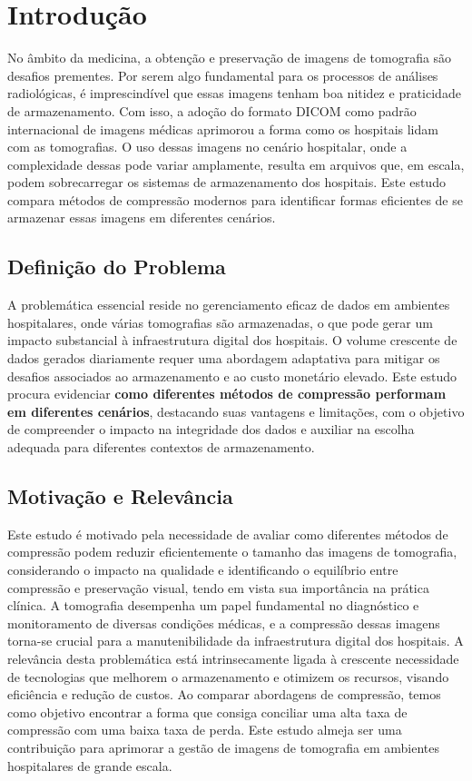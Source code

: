 \chapter{Introdução}
\label{cap:intro}

No âmbito da medicina, a obtenção e preservação de imagens de tomografia são desafios prementes. Por serem algo fundamental para os processos de análises radiológicas, é imprescindível que essas imagens tenham boa nitidez e praticidade de armazenamento. Com isso, a adoção do formato \acrfull{DICOM}
\cite{DICOM} como padrão internacional de imagens médicas aprimorou a forma como os hospitais lidam com as tomografias. O uso dessas imagens no cenário hospitalar, onde a complexidade dessas pode variar amplamente, resulta em arquivos que, em escala, podem sobrecarregar os sistemas de armazenamento dos hospitais. Este estudo compara métodos de compressão modernos para identificar formas eficientes de se armazenar essas imagens em diferentes cenários. 

\section{Definição do Problema}
\label{intro:prob}

A problemática essencial reside no gerenciamento eficaz de dados em ambientes hospitalares, onde várias tomografias são armazenadas, o que pode gerar um impacto substancial à infraestrutura digital dos hospitais. O volume crescente de dados gerados diariamente requer uma abordagem adaptativa para mitigar os desafios associados ao armazenamento e ao custo monetário elevado. Este estudo procura evidenciar \textbf{como diferentes métodos de compressão performam em diferentes cenários}, destacando suas vantagens e limitações, com o objetivo de compreender o impacto na integridade dos dados e auxiliar na escolha adequada para diferentes contextos de armazenamento.

\section{Motivação e Relevância}
\label{intro:motiv}

Este estudo é motivado pela necessidade de avaliar como diferentes métodos de compressão podem reduzir eficientemente o tamanho das imagens de tomografia, considerando o impacto na qualidade e identificando o equilíbrio entre compressão e preservação visual, tendo em vista sua importância na prática clínica. A tomografia desempenha um papel fundamental no diagnóstico e monitoramento de diversas condições médicas, e a compressão dessas imagens torna-se crucial para a manutenibilidade da infraestrutura digital dos hospitais. A relevância desta problemática está intrinsecamente ligada à crescente necessidade de tecnologias que melhorem o armazenamento e otimizem os recursos, visando eficiência e redução de custos. Ao comparar abordagens de compressão, temos como objetivo encontrar a forma que consiga conciliar uma alta taxa de compressão com uma baixa taxa de perda. Este estudo almeja ser uma contribuição para aprimorar a gestão de imagens de tomografia em ambientes hospitalares de grande escala.

